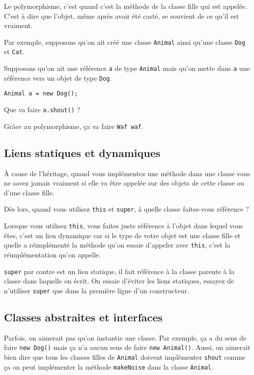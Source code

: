 Le polymorphisme, c'est quand c'est la méthode de la classe fille qui est
appelée. C'est à dire que l'objet, même après avoir été casté, se souvient
de ce qu'il est vraiment.

Par exemple, supposons qu'on ait créé une classe
\lstinline|Animal| ainsi qu'une classe \lstinline|Dog| et \lstinline|Cat|.

Supposons qu'on ait une référence \lstinline|a|
de type \lstinline|Animal| mais qu'on mette dans \lstinline|a|
une référence vers un objet de type \lstinline|Dog|.
\begin{lstlisting}
Animal a = new Dog();
\end{lstlisting}
Que va faire \lstinline|a.shout()| ?

Grâce au polymorphisme, ça va faire \lstinline|Waf waf|.

\subsection{Liens statiques et dynamiques}
\label{sec:this_super}
À cause de l'héritage, quand vous implémentez une méthode dans une classe
vous ne savez jamais vraiment si elle va être appelée sur des objets
de cette classe ou d'une classe fille. %

Dès lors, quand vous utilisez \lstinline|this| et \lstinline|super|,
à quelle classe faites-vous référence ?

Lorsque vous utilisez \lstinline|this|,
vous faites juste référence à l'objet dans lequel vous êtes,
c'est un lien dynamique car si le type de votre objet est une classe fille
et quelle a réimplémenté la méthode
qu'on essaie d'appeler avec \lstinline|this|,
c'est la réimplémentation qu'on appelle.

\lstinline|super| par contre est un lien statique,
il fait référence à la classe parente à la classe dans laquelle on écrit.
On essaie d'éviter les liens statiques,
essayez de n'utiliser \lstinline|super| que dans la première ligne
d'un constructeur.

\subsection{Classes abstraites et interfaces}
Parfois,
on aimerait pas qu'on instantie une classe.
Par exemple, ça a du sens de faire \lstinline|new Dog()|
mais ça n'a aucun sens de faire \lstinline|new Animal()|.
Aussi, on aimerait bien dire que tous les classes filles
de \lstinline|Animal| doivent implémenter \lstinline|shout|
comme ça on peut implémenter la méthode \lstinline|makeNoise|
dans la classe \lstinline|Animal|.

